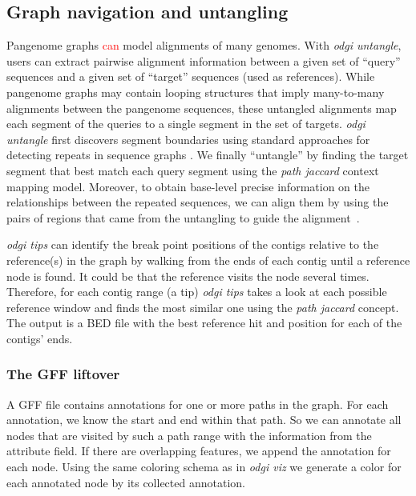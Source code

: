 \documentclass{bioinfo}
\newcommand{\REVIEWED}[1]{{\textcolor{Red}{#1}}}
\begin{document}
\subsection{Graph navigation and untangling}
\label{sec:supp_navigation}
Pangenome graphs \REVIEWED{can} model alignments of many genomes.
With \textit{odgi untangle}, users can extract pairwise alignment information between a given set of ``query'' sequences and a given set of ``target'' sequences (used as references).
While pangenome graphs may contain looping structures that imply many-to-many alignments between the pangenome sequences, these untangled alignments map each segment of the queries to a single segment in the set of targets.
\textit{odgi untangle} first discovers segment boundaries using standard approaches for detecting repeats in sequence graphs \citep{Pevzner_2004}.
We finally ``untangle'' by finding the target segment that best match each query segment using the \textit{path jaccard} context mapping model.
Moreover, to obtain base-level precise information on the relationships between the repeated sequences, we can align them by using the pairs of regions that came from the untangling to guide the alignment~\citep{wfmash}.

\textit{odgi tips} can identify the break point positions of the contigs relative to the reference(s) in the graph by walking from the ends of each contig until a reference node is found.
It could be that the reference visits the node several times. Therefore, for each contig range (a tip) \textit{odgi tips} takes a look at each possible reference window and finds the most similar one using the \textit{path jaccard} concept.
The output is a BED file with the best reference hit and position for each of the contigs' ends.

\subsubsection{The GFF liftover}
\label{sec:supp_gff}
A GFF file contains annotations for one or more paths in the graph. For each annotation, we know the start and end within that path. So we can annotate all nodes that are visited by such a path range with the information from the attribute field. If there are overlapping features, we append the annotation for each node. Using the same coloring schema as in \textit{odgi viz} we generate a color for each annotated node by its collected annotation.
\end{document}

